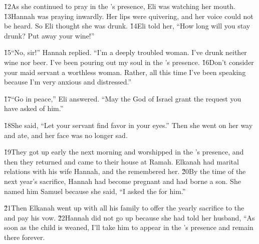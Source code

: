 \v{12}As she continued to pray in the 's presence, Eli was watching her mouth. \v{13}Hannah was praying inwardly. Her lips were quivering, and her voice could not be heard. So Eli thought she was drunk. \v{14}Eli told her, ``How long will you stay drunk? Put away your wine!''

\v{15}``No, sir!'' Hannah replied. ``I'm a deeply troubled woman. I've drunk neither wine nor beer. I've been pouring out my soul in the 's presence. \v{16}Don't consider your maid servant a worthless woman. Rather, all this time I've been speaking because I'm very anxious and distressed.''

\v{17}``Go in peace,'' Eli answered. ``May the God of Israel grant the request you have asked of him.''

\v{18}She said, ``Let your servant find favor in your eyes.'' Then she went on her way and ate, and her face was no longer sad.

\v{19}They got up early the next morning and worshipped in the 's presence, and then they returned and came to their house at Ramah. Elkanah had marital relations with his wife Hannah, and the  remembered her. \v{20}By the time of the next year's sacrifice, Hannah had become pregnant and had borne a son. She named him Samuel because she said, ``I asked the  for him.''

\v{21}Then Elkanah went up with all his family to offer the yearly sacrifice to the  and pay his vow. \v{22}Hannah did not go up because she had told her husband, ``As soon as the child is weaned, I'll take him to appear in the 's presence and remain there forever.

